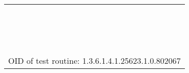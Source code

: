 \documentclass{article}
\begin{document}
\begin{longtable}{|p{}|}
\rowcolor{white}{\verb=  SSL3_ADH_RC4_40_MD5=}\\
\rowcolor{white}{\verb=  SSL3_ADH_RC4_128_MD5=}\\
\rowcolor{white}{\verb=  SSL3_ADH_DES_40_CBC_SHA=}\\
\rowcolor{white}{\verb=  TLS1_RSA_RC4_40_MD5=}\\
\rowcolor{white}{\verb=  TLS1_RSA_RC4_128_MD5=}\\
\rowcolor{white}{\verb=  TLS1_RSA_RC4_128_SHA=}\\
\rowcolor{white}{\verb=  TLS1_RSA_RC2_40_MD5=}\\
\rowcolor{white}{\verb=  TLS1_RSA_DES_40_CBC_SHA=}\\
\rowcolor{white}{\verb=  TLS1_EDH_RSA_DES_40_CBC_SHA=}\\
\rowcolor{white}{\verb=  TLS1_ADH_RC4_40_MD5=}\\
\rowcolor{white}{\verb=  TLS1_ADH_RC4_128_MD5=}\\
\rowcolor{white}{\verb=  TLS1_ADH_DES_40_CBC_SHA=}\\
\rowcolor{white}{\verb=No non-ciphers are supported by this service=}\\
\rowcolor{white}{\verb==}\\
\rowcolor{white}{\verb==}\\
\\
OID of test routine: 1.3.6.1.4.1.25623.1.0.802067\\
\end{longtable}
\end{document}

